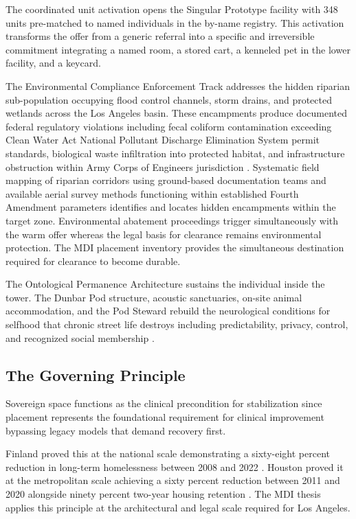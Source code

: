 \documentclass[12pt, letterpaper]{article}
\begin{document}
The coordinated unit activation opens the Singular Prototype facility with 348 units pre-matched to named individuals in the by-name registry. This activation transforms the offer from a generic referral into a specific and irreversible commitment integrating a named room, a stored cart, a kenneled pet in the lower facility, and a keycard.

The Environmental Compliance Enforcement Track addresses the hidden riparian sub-population occupying flood control channels, storm drains, and protected wetlands across the Los Angeles basin. These encampments produce documented federal regulatory violations including fecal coliform contamination exceeding Clean Water Act National Pollutant Discharge Elimination System permit standards, biological waste infiltration into protected habitat, and infrastructure obstruction within Army Corps of Engineers jurisdiction \citep{clean_water_act_1972}. Systematic field mapping of riparian corridors using ground-based documentation teams and available aerial survey methods functioning within established Fourth Amendment parameters identifies and locates hidden encampments within the target zone. Environmental abatement proceedings trigger simultaneously with the warm offer whereas the legal basis for clearance remains environmental protection. The MDI placement inventory provides the simultaneous destination required for clearance to become durable.

The Ontological Permanence Architecture sustains the individual inside the tower. The Dunbar Pod structure, acoustic sanctuaries, on-site animal accommodation, and the Pod Steward rebuild the neurological conditions for selfhood that chronic street life destroys including predictability, privacy, control, and recognized social membership \citep{giddens_1991, laing_1960}.

\subsection{The Governing Principle}

Sovereign space functions as the clinical precondition for stabilization since placement represents the foundational requirement for clinical improvement bypassing legacy models that demand recovery first.

Finland proved this at the national scale demonstrating a sixty-eight percent reduction in long-term homelessness between 2008 and 2022 \citep{finland_housing_first_2023}. Houston proved it at the metropolitan scale achieving a sixty percent reduction between 2011 and 2020 alongside ninety percent two-year housing retention \citep{houston_way_home_2024}. The MDI thesis applies this principle at the architectural and legal scale required for Los Angeles.
\end{document}
